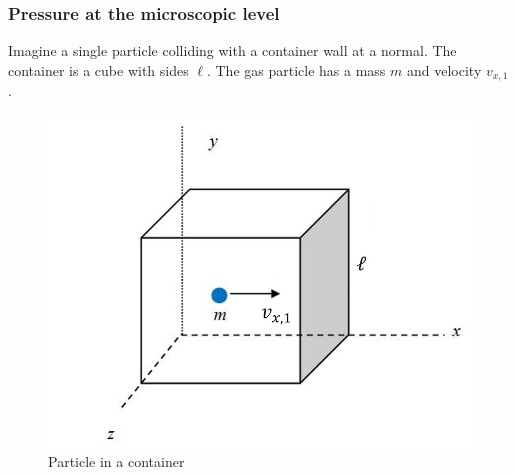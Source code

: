 \subsubsection{Pressure at the microscopic level}

Imagine a single particle colliding with a container wall at a normal. The container is a cube with sides $\ell$. The gas particle has a mass $m$ and velocity $v_{x, 1}$. 

\begin{figure}[h!]
    \centering
    \includegraphics[scale=0.75]{notes/images/Particle-In-Box.JPG}
    \caption{Particle in a container}
\end{figure}
\FloatBarrier

